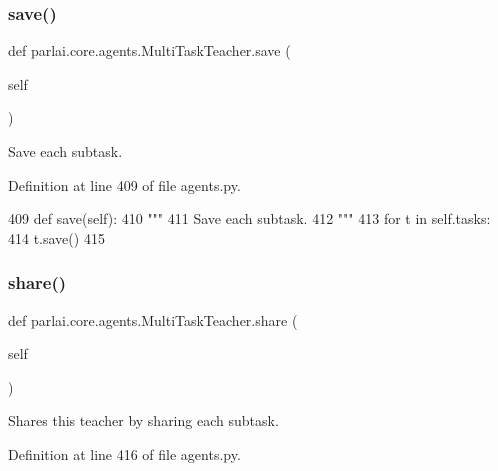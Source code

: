\subsubsection{\texorpdfstring{save()}{save()}}
{\footnotesize\ttfamily def parlai.\+core.\+agents.\+Multi\+Task\+Teacher.\+save (\begin{DoxyParamCaption}\item[{}]{self }\end{DoxyParamCaption})}

\begin{DoxyVerb}Save each subtask.
\end{DoxyVerb}
 

Definition at line 409 of file agents.\+py.


\begin{DoxyCode}
409     \textcolor{keyword}{def }save(self):
410         \textcolor{stringliteral}{"""}
411 \textcolor{stringliteral}{        Save each subtask.}
412 \textcolor{stringliteral}{        """}
413         \textcolor{keywordflow}{for} t \textcolor{keywordflow}{in} self.tasks:
414             t.save()
415 
\end{DoxyCode}
\mbox{\label{classparlai_1_1core_1_1agents_1_1MultiTaskTeacher_adbd1854cad9eb58ba1c7736b44bf5e96}} 
\subsubsection{\texorpdfstring{share()}{share()}}
{\footnotesize\ttfamily def parlai.\+core.\+agents.\+Multi\+Task\+Teacher.\+share (\begin{DoxyParamCaption}\item[{}]{self }\end{DoxyParamCaption})}

\begin{DoxyVerb}Shares this teacher by sharing each subtask.
\end{DoxyVerb}
 

Definition at line 416 of file agents.\+py.


